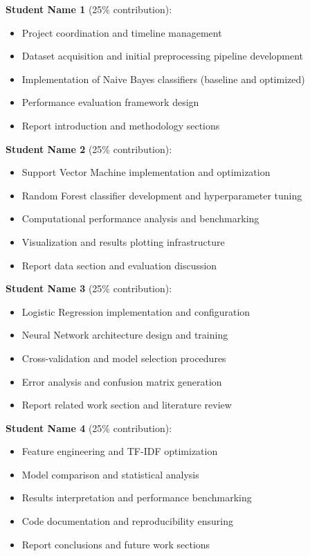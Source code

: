 \documentclass[11pt,a4paper]{article}
\begin{document}
\textbf{Student Name 1} (25\% contribution):
\begin{itemize}
    \item Project coordination and timeline management
    \item Dataset acquisition and initial preprocessing pipeline development
    \item Implementation of Naive Bayes classifiers (baseline and optimized)
    \item Performance evaluation framework design
    \item Report introduction and methodology sections
\end{itemize}

\textbf{Student Name 2} (25\% contribution):
\begin{itemize}
    \item Support Vector Machine implementation and optimization
    \item Random Forest classifier development and hyperparameter tuning
    \item Computational performance analysis and benchmarking
    \item Visualization and results plotting infrastructure
    \item Report data section and evaluation discussion
\end{itemize}

\textbf{Student Name 3} (25\% contribution):
\begin{itemize}
    \item Logistic Regression implementation and configuration
    \item Neural Network architecture design and training
    \item Cross-validation and model selection procedures
    \item Error analysis and confusion matrix generation
    \item Report related work section and literature review
\end{itemize}

\textbf{Student Name 4} (25\% contribution):
\begin{itemize}
    \item Feature engineering and TF-IDF optimization
    \item Model comparison and statistical analysis
    \item Results interpretation and performance benchmarking
    \item Code documentation and reproducibility ensuring
    \item Report conclusions and future work sections
\end{itemize}
\end{document}

